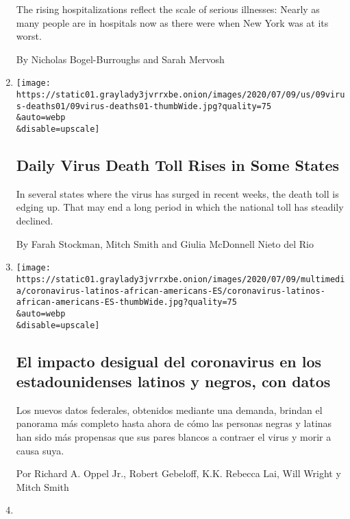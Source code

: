 \begin{enumerate}
  The rising hospitalizations reflect the scale of serious illnesses:
  Nearly as many people are in hospitals now as there were when New York
  was at its worst.

  By Nicholas Bogel-Burroughs and Sarah Mervosh
\item
  \href{/2020/07/10/us/daily-virus-death-toll-rises-in-some-states.html}{}

  \texttt{[image: https://static01.graylady3jvrrxbe.onion/images/2020/07/09/us/09virus-deaths01/09virus-deaths01-thumbWide.jpg?quality=75\\\&auto=webp\\\&disable=upscale]}

  \hypertarget{daily-virus-death-toll-rises-in-some-states}{%
  \subsection{Daily Virus Death Toll Rises in Some
  States}\label{daily-virus-death-toll-rises-in-some-states}}

  In several states where the virus has surged in recent weeks, the
  death toll is edging up. That may end a long period in which the
  national toll has steadily declined.

  By Farah Stockman, Mitch Smith and Giulia McDonnell Nieto del Rio
\item
  \href{/es/interactive/2020/07/09/espanol/mundo/coronavirus-latinos-africanoamericanos-datos.html}{}

  \texttt{[image: https://static01.graylady3jvrrxbe.onion/images/2020/07/09/multimedia/coronavirus-latinos-african-americans-ES/coronavirus-latinos-african-americans-ES-thumbWide.jpg?quality=75\\\&auto=webp\\\&disable=upscale]}

  \hypertarget{el-impacto-desigual-del-coronavirus-en-los-estadounidenses-latinos-y-negros-con-datos}{%
  \subsection{El impacto desigual del coronavirus en los estadounidenses
  latinos y negros, con
  datos}\label{el-impacto-desigual-del-coronavirus-en-los-estadounidenses-latinos-y-negros-con-datos}}

  Los nuevos datos federales, obtenidos mediante una demanda, brindan el
  panorama más completo hasta ahora de cómo las personas negras y
  latinas han sido más propensas que sus pares blancos a contraer el
  virus y morir a causa suya.

  Por Richard A. Oppel Jr., Robert Gebeloff, K.K. Rebecca Lai, Will
  Wright y Mitch Smith
\item
  \href{/interactive/2020/07/05/us/coronavirus-latinos-african-americans-cdc-data.html}{}


\end{enumerate}
